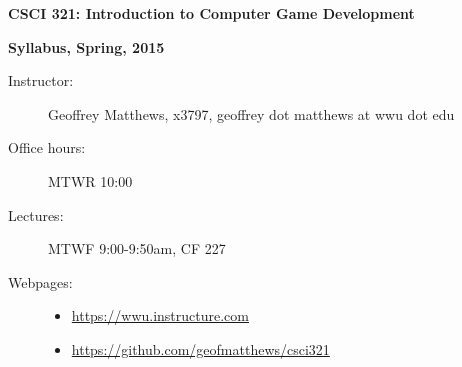 \documentclass{article}
\begin{document}
\centerline{\Large \bf CSCI 321: Introduction to Computer Game Development}

\centerline{\bf Syllabus,  Spring, 2015}

\begin{description}

\item[Instructor:] Geoffrey Matthews, x3797,
 geoffrey dot matthews at wwu dot edu

\item[Office hours:] MTWR 10:00

\item[Lectures:] MTWF 9:00-9:50am, CF 227


\item [Webpages:] \mbox{}\begin{itemize}
\item\url{https://wwu.instructure.com} 
\item\url{https://github.com/geofmatthews/csci321}
\end{itemize}




\end{description}
\end{document}
